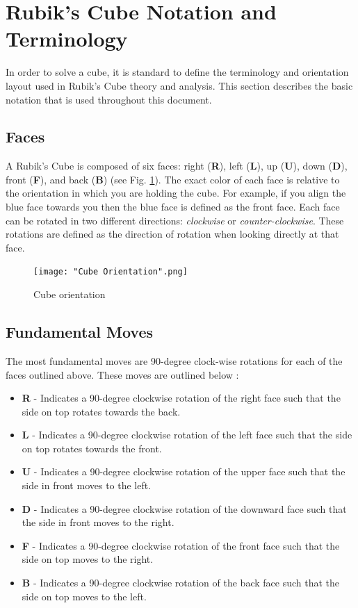 \documentclass[11pt,english]{article}
\begin{document}
\appendix
\section{Rubik's Cube Notation and Terminology}
\label{sec:Appendix A}
In order to solve a cube, it is standard to define the terminology and orientation layout used in Rubik's Cube theory and analysis. This section describes the basic notation that is used throughout this document.

\subsection{Faces}
A Rubik's Cube is composed of six faces: right (\textbf{R}), left (\textbf{L}), up (\textbf{U}), down (\textbf{D}), front (\textbf{F}), and back (\textbf{B}) (see Fig. \ref{fig:Cube Orientation}). The exact color of each face is relative to the orientation in which you are holding the cube. For example, if you align the blue face towards you then the blue face is defined as the front face. Each face can be rotated in two different directions: \textit{clockwise} or \textit{counter-clockwise}. These rotations are defined as the direction of rotation when looking directly at that face.

\begin{figure}[!ht]
\centering
\texttt{[image: "Cube Orientation".png]}
\caption{Cube orientation}
\label{fig:Cube Orientation}
\end{figure}

\subsection{Fundamental Moves}
The most fundamental moves are 90-degree clock-wise rotations for each of the faces outlined above. These moves are outlined below \cite{Basic Cube Notation}:

\begin{itemize}

\item{\textbf{R}} - Indicates a 90-degree clockwise rotation of the right face such that the side on top rotates towards the back.
\item{\textbf{L}} - Indicates a 90-degree clockwise rotation of the left face such that the side on top rotates towards the front.
\item{\textbf{U}} - Indicates a 90-degree clockwise rotation of the upper face such that the side in front moves to the left.
\item{\textbf{D}} - Indicates a 90-degree clockwise rotation of the downward face such that the side in front moves to the right.
\item{\textbf{F}} - Indicates a 90-degree clockwise rotation of the front face such that the side on top moves to the right.
\item{\textbf{B}} - Indicates a 90-degree clockwise rotation of the back face such that the side on top moves to the left.
\end{itemize}
\end{document}
